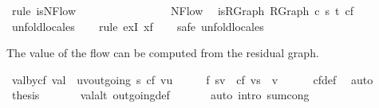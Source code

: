 \begin{isabellebody}
\ {\isacharparenleft}rule\ is{\isacharunderscore}NFlow{\isacharparenright}%
\endisatagproof
{\isafoldproof}%
%
\isadelimproof
%
\endisadelimproof
\isanewline
{}\isamarkupfalse%
\ \ \ \ \ \ \ \ \isanewline
\ \ \ \ \ \ \isanewline
{}\isamarkupfalse%
\ NFlow\ \isanewline
\isanewline
{}\isamarkupfalse%
\ is{\isacharunderscore}RGraph{\isacharcolon}\ {\isachardoublequoteopen}RGraph\ c\ s\ t\ cf{\isachardoublequoteclose}\isanewline
%
\isadelimproof
\ \ %
\endisadelimproof
%
\isatagproof
{}\isamarkupfalse%
\ unfold{\isacharunderscore}locales\isanewline
\ \ \isamarkupfalse%
\ {\isacharparenleft}rule\ exI{\isacharbrackleft}\ x{\isacharequal}f{\isacharbrackright}{\isacharparenright}\isanewline
\ \ \isamarkupfalse%
\ {\isacharparenleft}safe{\isacharsemicolon}\ unfold{\isacharunderscore}locales{\isacharparenright}\isanewline
\ \ \isamarkupfalse%
%
\endisatagproof
{\isafoldproof}%
%
\isadelimproof
%
\endisadelimproof
%
\begin{isamarkuptext}%
The value of the flow can be computed from the residual graph.%
\end{isamarkuptext}\isamarkuptrue%
\isamarkupfalse%
\ val{\isacharunderscore}by{\isacharunderscore}cf{\isacharcolon}\ {\isachardoublequoteopen}val\ {\isacharequal}\ {\isacharparenleft}{\isasymSum}{\isacharparenleft}u{\isacharcomma}v{\isacharparenright}{\isasymin}outgoing\ s{\isachardot}\ cf\ {\isacharparenleft}v{\isacharcomma}u{\isacharparenright}{\isacharparenright}{\isachardoublequoteclose}\isanewline
%
\isadelimproof
%
\endisadelimproof
%
\isatagproof
{}\isamarkupfalse%
\ {\isacharminus}\isanewline
\ \ \isamarkupfalse%
\ {\isachardoublequoteopen}f\ {\isacharparenleft}s{\isacharcomma}v{\isacharparenright}\ {\isacharequal}\ cf\ {\isacharparenleft}v{\isacharcomma}s{\isacharparenright}{\isachardoublequoteclose}\ \ v\isanewline
\ \ \ \ \isamarkupfalse%
\ cf{\isacharunderscore}def\ \isamarkupfalse%
\ auto\isanewline
\ \ \isamarkupfalse%
\ {\isacharquery}thesis\ \isanewline
\ \ \ \ \isamarkupfalse%
\ val{\isacharunderscore}alt\ outgoing{\isacharunderscore}def\ \isanewline
\ \ \ \ \isamarkupfalse%
\ {\isacharparenleft}auto\ intro{\isacharbang}{\isacharcolon}\ sum{\isachardot}cong{\isacharparenright}\ \isanewline
{}\isamarkupfalse%
%
\endisatagproof
{\isafoldproof}%
%
\isadelimproof

\end{isabellebody}
